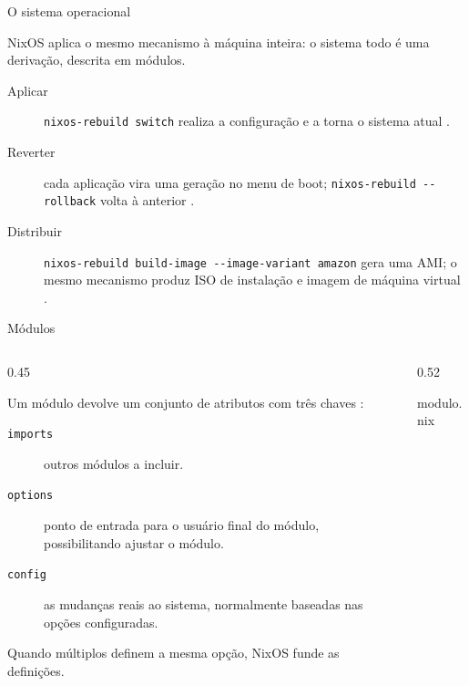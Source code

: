 \documentclass{beamer}
\newcommand{\termo}[1]{\alert{#1}}
\newcommand{\code}[1]{\texttt{#1}}
\newlength{\nixcodelift}\setlength{\nixcodelift}{7pt}
\newcommand{\nixcode}[2]{\vspace*{-\nixcodelift}\begin{nixbox}{#2}\end{nixbox}}
\begin{document}
\begin{frame}{O sistema operacional}
	\raggedright
	NixOS aplica o mesmo mecanismo à máquina inteira: o sistema todo é uma derivação, descrita em \termo{módulos}.

	\medskip
	\begin{description}
		\item[Aplicar] \code{nixos-rebuild switch} realiza a configuração e a torna o sistema atual \cite{nixos-manual}.
		\item[Reverter] cada aplicação vira uma \termo{geração} no menu de boot; \code{nixos-rebuild -{}-rollback} volta à anterior \cite{nixos-manual}.
		\item[Distribuir] \code{nixos-rebuild build-image -{}-image-variant amazon} gera uma AMI; o mesmo mecanismo produz ISO de instalação e imagem de máquina virtual \cite{nixos-manual}.
	\end{description}
\end{frame}

\begin{frame}{Módulos}
	\begin{columns}[T,onlytextwidth]
		\begin{column}{0.45\textwidth}
			\small\raggedright
			Um módulo devolve um conjunto de atributos com três chaves \cite{nixos-wiki-modules}:

			\begin{description}
				\item[\code{imports}] outros módulos a incluir.
				\item[\code{options}] ponto de entrada para o usuário final do módulo, possibilitando ajustar o módulo.
				\item[\code{config}] as mudanças reais ao sistema, normalmente baseadas nas opções configuradas.
			\end{description}

			Quando múltiplos definem a mesma opção, NixOS funde as definições.
		\end{column}

		\begin{column}{0.52\textwidth}
			\nixcode{code/modulo}{modulo.nix}
		\end{column}
	\end{columns}
\end{frame}
\end{document}
